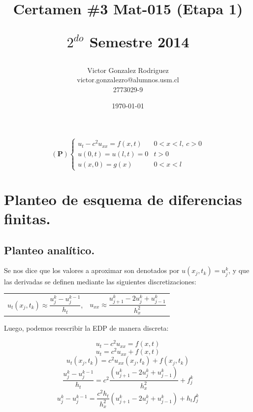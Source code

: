 \documentclass[12pt,letterpaper]{article}
\begin{document}
\title{\textbf{Certamen \#3 Mat-015 (Etapa 1)} \\ \begin{Large}$2^{do}$ Semestre 2014\end{Large}} 
\author{Victor Gonzalez Rodriguez\\victor.gonzalezro@alumnos.usm.cl\\2773029-9}
\date{\today}
\maketitle

\begin{equation*}
(\textbf{P})\begin{cases}
u_t-c^2u_{xx} = f(x,t) & 0<x<l,\ c>0 \\
u(0,t) = u(l,t) = 0 & t > 0 \\
u(x,0) = g(x) & 0<x<l
\end{cases}
\end{equation*}

\section{Planteo de esquema de diferencias finitas.}
\subsection{Planteo analítico.}

Se nos dice que los valores a aproximar son denotados por $u(x_j,t_k) = u_j^k$, y que las derivadas se definen mediante las siguientes discretizaciones:

\begin{center}
\begin{tabular}{c c}
$u_t(x_j,t_k) \approx \dfrac{u_j^k - u_j^{k-1}}{h_t}$, & $u_{xx} \approx \dfrac{u_{j+1}^k - 2u_j^k + u_{j-1}^k}{h_x^2}$
\end{tabular}
\end{center}

Luego, podemos reescribir la EDP de manera discreta:

\begin{equation}u_t-c^2u_{xx} = f(x,t)\end{equation}
\begin{equation}u_t = c^2u_{xx} + f(x,t)\end{equation}
\begin{equation}u_t(x_j,t_k) = c^2u_{xx}(x_j,t_k) + f(x_j,t_k)\end{equation}
\begin{equation}\dfrac{u_j^k - u_j^{k-1}}{h_t} = c^2\dfrac{(u_{j+1}^k - 2u_j^k + u_{j-1}^k)}{h_x^2} + f_j^k\end{equation}
\begin{equation}u_j^k - u_j^{k-1} = \dfrac{c^2h_t}{h^2_x} (u_{j+1}^k - 2u_j^k + u_{j-1}^k) + h_tf_j^k\end{equation}
\end{document}
